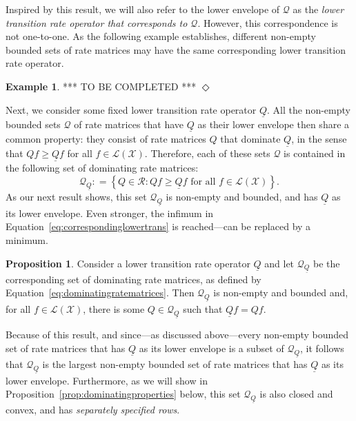 \documentclass[10pt]{paper}
\theoremstyle{definition}
\newtheorem{exmp}{Example}%
\newtheorem{proposition}[theorem]{Proposition}
\newcommand{\states}{\mathcal{X}}
\newcommand{\gambles}{\mathcal{L}}
\newcommand{\gamblesX}{\gambles(\states)}
\newcommand{\rateset}{\mathcal{Q}}
\newcommand{\lrate}{\underline{Q}}
\newcommand{\coloneqq}{:\!=}
\newcommand{\exampleend}{\hfill$\Diamond$}
\begin{document}
\noindent
Inspired by this result, we will also refer to the lower envelope of $\rateset$ as the \emph{lower transition rate operator that corresponds to $\rateset$}. %
However, this correspondence is not one-to-one. As the following example establishes, different non-empty bounded sets of rate matrices may have the same corresponding lower transition rate operator.

\begin{exmp}
*** TO BE COMPLETED ***
\exampleend
\end{exmp}

Next, we consider some fixed lower transition rate operator $\lrate$.
All the non-empty bounded sets $\rateset$ of rate matrices that have $\lrate$ as their lower envelope then share a common property: they consist of rate matrices $Q$ that dominate $\lrate$, in the sense that $Qf\geq\lrate f$ for all $f\in\gamblesX$. Therefore, each of these sets $\rateset$ is contained in the following set of dominating rate matrices:
\begin{equation}\label{eq:dominatingratematrices}
\rateset_{\lrate}\coloneqq
\left\{
Q\in\mathcal{R}
\colon
Qf\geq\lrate f\text{ for all $f\in\gamblesX$}
\right\}.
\end{equation}
As our next result shows, this set $\rateset_{\lrate}$ is non-empty and bounded, and has $\lrate$ as its lower envelope. Even stronger, the infimum in Equation~\eqref{eq:correspondinglowertrans} is reached---can be replaced by a minimum.

\begin{proposition}\label{prop:dominating_nonempty_bounded}
Consider a lower transition rate operator $\lrate$ and let $\rateset_{\lrate}$ be the corresponding set of dominating rate matrices, as defined by Equation~\eqref{eq:dominatingratematrices}. Then $\rateset_{\lrate}$ is non-empty and bounded and, for all $f\in\gamblesX$, there is some $Q\in\rateset_{\lrate}$ such that $\lrate f=Qf$.
\end{proposition}

\noindent
Because of this result, and since---as discussed above---every non-empty bounded set of rate matrices that has $\lrate$ as its lower envelope is a subset of $\rateset_{\lrate}$, it follows that $\rateset_{\lrate}$ is the largest non-empty bounded set of rate matrices that has $\lrate$ as its lower envelope.
Furthermore, as we will show in Proposition~\ref{prop:dominatingproperties} below, this set $\rateset_{\lrate}$ is also closed and convex, and has \emph{separately specified rows}.
\end{document}
